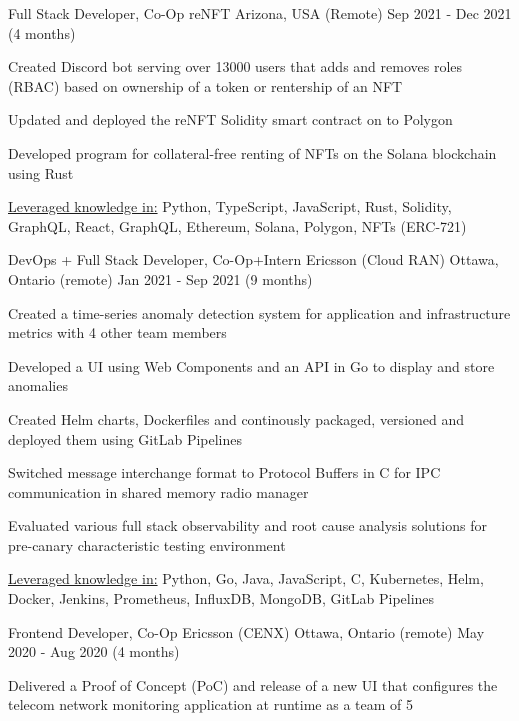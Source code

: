 \begin{cventries}
	\cventry
	{Full Stack Developer, Co-Op}
	{reNFT}
	{Arizona, USA (Remote)}
	{Sep 2021 - Dec 2021 (4 months)}
	{
		\begin{cvitems}
			\item{Created Discord bot serving over 13000 users that adds and removes roles (RBAC) based on ownership of a token or rentership of an NFT}
			\item{Updated and deployed the reNFT Solidity smart contract on to Polygon}
			\item{Developed program for collateral-free renting of NFTs on the Solana blockchain using Rust}
			\item{\underline{Leveraged knowledge in:} Python, TypeScript, JavaScript, Rust, Solidity, GraphQL, React, GraphQL, Ethereum, Solana, Polygon, NFTs (ERC-721)}
		\end{cvitems}
	}
	\cventry
	{DevOps + Full Stack Developer, Co-Op+Intern}
	{Ericsson (Cloud RAN)}
	{Ottawa, Ontario (remote)}
	{Jan 2021 - Sep 2021 (9 months)}
	{
		\begin{cvitems}
			\item{Created a time-series anomaly detection system for application and infrastructure metrics with 4 other team members}
			\item{Developed a UI using Web Components and an API in Go to display and store anomalies}
			\item{Created Helm charts, Dockerfiles and continously packaged, versioned and deployed them using GitLab Pipelines}
			\item{Switched message interchange format to Protocol Buffers in C for IPC communication in shared memory radio manager}
			\item{Evaluated various full stack observability and root cause analysis solutions for pre-canary characteristic testing environment}
			\item{\underline{Leveraged knowledge in:} Python, Go, Java, JavaScript, C, Kubernetes, Helm, Docker, Jenkins, Prometheus, InfluxDB, MongoDB, GitLab Pipelines}
		\end{cvitems}
	}
	\cventry
	{Frontend Developer, Co-Op}
	{Ericsson (CENX)}
	{Ottawa, Ontario (remote)}
	{May 2020 - Aug 2020 (4 months)}
	{
		\begin{cvitems}
			\item{Delivered a Proof of Concept (PoC) and release of a new UI that configures the telecom network monitoring application at runtime as a team of 5}

\end{cvitems}}
\end{cventries}
